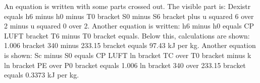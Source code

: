 An equation is written with some parts crossed out. The visible part is: Dexistr equals h6 minus h0 minus T0 bracket S0 minus S6 bracket plus u squared 6 over 2 minus u squared 0 over 2. Another equation is written: h6 minus h0 equals CP LUFT bracket T6 minus T0 bracket equals. Below this, calculations are shown: 1.006 bracket 340 minus 233.15 bracket equals 97.43 kJ per kg. Another equation is shown: Sc minus S0 equals CP LUFT ln bracket TC over T0 bracket minus k ln bracket PE over P0 bracket equals 1.006 ln bracket 340 over 233.15 bracket equals 0.3373 kJ per kg.